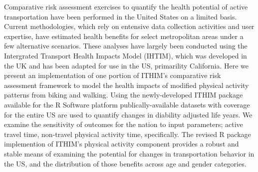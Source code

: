 Comparative risk assessment exercises to quantify the health potential of active transportation have been performed in the United States on a limited basis. Current methodologies, which rely on entensive data collection activities and user expertise, have estimated health benefits for select metropolitan areas under a few alternative scenarios. These analyses have largely been conducted using the Intergrated Transport Health Impacts Model (IHTIM), which was developed in the UK and has been adapted for use in the US, primarility California. Here we present an implementation of one portion of ITHIM's comparative risk assessment framework to model the health impacts of modified physical activity patterns from biking and walking. Using the newly-developed ITHIM package available for the R Software platform publically-available datasets with coverage for the entire US are used to quantify changes in diability adjusted life years. We examine the sensitivity of outcomes for the nation to input parameters; active travel time, non-travel physical activity time, specifically. The revised R package implemention of ITHIM's physical activity component provides a robust and stable means of examining the potential for changes in transportation behavior in the US, and the distribution of those benefits across age and gender categories.


